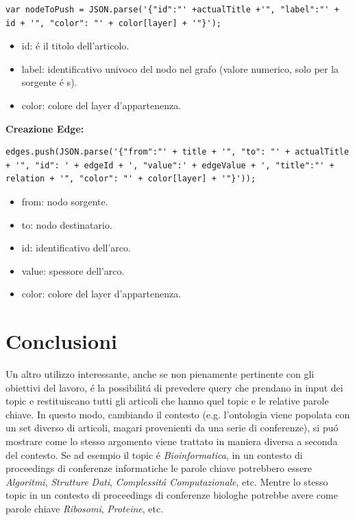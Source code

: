 \documentclass[11pt,a4paper]{article}
\begin{document}
\begin{lstlisting}[breaklines=true,style=java]
var nodeToPush = JSON.parse('{"id":"' +actualTitle +'", "label":"' + id + '", "color": "' + color[layer] + '"}');
\end{lstlisting}
\begin{itemize}
\item id: \'e il titolo dell'articolo.
\item label: identificativo univoco del nodo nel grafo (valore numerico, solo per la sorgente \'e s).
\item color: colore del layer d'appartenenza.
\newline\newline
\end{itemize}

\textbf{Creazione Edge:} 
\begin{lstlisting}[breaklines=true,style=java]
edges.push(JSON.parse('{"from":"' + title + '", "to": "' + actualTitle + '", "id": ' + edgeId + ', "value":' + edgeValue + ', "title":"' + relation + '", "color": "' + color[layer] + '"}'));
\end{lstlisting}
\begin{itemize}
\item from: nodo sorgente.
\item to: nodo destinatario.
\item id: identificativo dell'arco.
\item value: spessore dell'arco.
\item color: colore del layer d'appartenenza.
\end{itemize}


   

\section{Conclusioni}
\label{sec:conclusions}
Un altro utilizzo interessante, anche se non pienamente pertinente con gli obiettivi del lavoro, \'e la possibilit\'a di prevedere query che prendano in input dei topic e restituiscano tutti gli articoli che hanno quel topic e le relative parole chiave. In questo modo, cambiando il contesto (e.g. l'ontologia viene popolata con un set diverso di articoli, magari provenienti da una serie di conferenze), si pu\'o mostrare come lo stesso argomento viene trattato in maniera diversa a seconda del contesto. Se ad esempio il topic \'e \emph{Bioinformatica}, in un contesto di proceedings di conferenze informatiche le parole chiave potrebbero essere \emph{Algoritmi}, \emph{Strutture Dati}, \emph{Complessit\'a Computazionale}, etc. Mentre lo stesso topic in un contesto di proceedings di conferenze biologhe potrebbe avere come parole chiave \emph{Ribosomi}, \emph{Proteine}, etc. 
\end{document}
